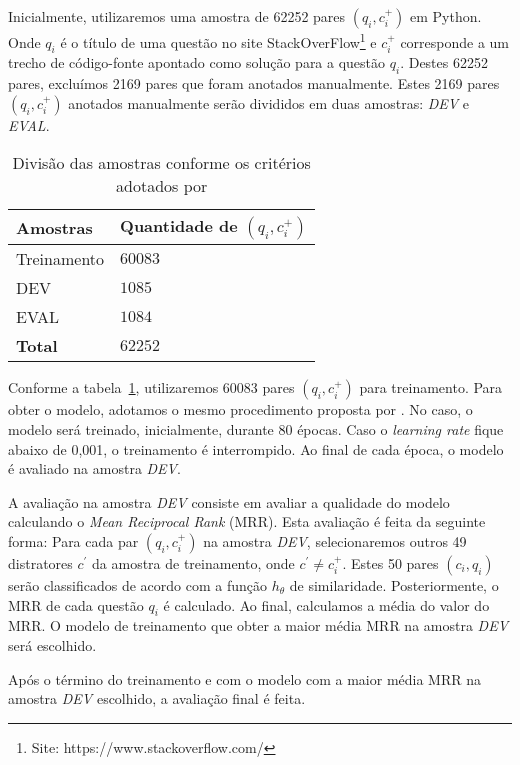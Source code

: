 \documentclass[12pt]{article}
\begin{document}
Inicialmente, utilizaremos uma amostra de 62252 pares $(q_{i}, c_{i}^{+})$ em Python. Onde $q_{i}$ é o título de uma questão no site StackOverFlow\footnote{Site: https://www.stackoverflow.com/} e $c_{i}^{+}$ corresponde a um trecho de código-fonte apontado como solução para a questão $q_{i}$. Destes 62252 pares, excluímos 2169 pares que foram anotados manualmente. Estes 2169 pares $(q_{i}, c_{i}^{+})$ anotados manualmente serão divididos em duas amostras: \emph{DEV} e \emph{EVAL}.


\begin{table}[h]
\centering
\begin{tabular}{ |p{3cm}|p{3cm}|  }
 \hline
 \textbf{Amostras} & \textbf{Quantidade de $(q_{i}, c_{i}^{+})$}\\
 \hline
 Treinamento & $60083$\\
 \hline
 DEV & $1085$ \\
 \hline
 EVAL & $1084$\\
 \hline
 \textbf{Total} & $62252$\\
 \hline
\end{tabular}
\caption{Divisão das amostras conforme os critérios adotados por \cite{iyer-etal-2016-summarizing}}
\label{table:divisao-amostras}
\end{table}

Conforme a tabela~\ref{table:divisao-amostras}, utilizaremos 60083 pares $(q_{i}, c_{i}^{+})$ para treinamento. Para obter o modelo, adotamos o mesmo procedimento proposta por \cite{iyer-etal-2016-summarizing}. No caso, o modelo será treinado, inicialmente, durante 80 épocas. Caso o \textit{learning rate} fique abaixo de 0,001, o treinamento é interrompido. Ao final de cada época, o modelo é avaliado na amostra \emph{DEV}. 


A avaliação na amostra \emph{DEV} consiste em avaliar a qualidade do modelo calculando o \textit{Mean Reciprocal Rank} (MRR). Esta avaliação é feita da seguinte forma:
 Para cada par $(q_{i}, c_{i}^{+})$ na amostra \emph{DEV}, selecionaremos outros 49 distratores $c^{'}$ da amostra de treinamento, onde $c^{'} \neq c_{i}^{+}$. Estes 50 pares $(c_{i}, q_{i})$ serão classificados de acordo com a função $h_{\theta}$ de similaridade. Posteriormente, o MRR de cada questão $q_{i}$ é calculado. Ao final, calculamos a média do valor do MRR. O modelo de treinamento que obter a maior média MRR na amostra \emph{DEV} será escolhido. 
 
 
 
 Após o término do treinamento e com o modelo com a maior média MRR na amostra \emph{DEV} escolhido, a avaliação final é feita.
\end{document}
